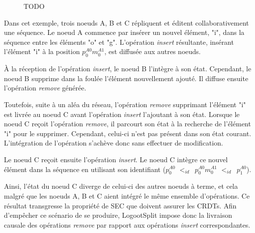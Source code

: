\documentclass[12pt]{thesul}
\newcommand{\trm}[1]{\mathit{#1}}
\newcommand{\id}[3]{$\trm{#1}^{\trm{#2}}_{\trm{#3}}$}
\newcommand{\lid}{$<_{id}$~}
\begin{document}
\begin{figure}[!ht]
{
  }
  \caption{TODO}
  \label{fig:why-causal-remove}
\end{figure}

Dans cet exemple, trois noeuds A, B et C répliquent et éditent collaborativement une séquence.
Le noeud A commence par insérer un nouvel élément, "i", dans la séquence entre les éléments "o" et "g".
L'opération \emph{insert} résultante, insérant l'élément "i" à la position \id{p}{A0}{0}\id{m}{A1}{0}, est diffusée aux autres noeuds.

À la réception de l'opération \emph{insert}, le noeud B l'intègre à son état.
Cependant, le noeud B supprime dans la foulée l'élément nouvellement ajouté.
Il diffuse ensuite l'opération \emph{remove} générée.

Toutefois, suite à un aléa du réseau, l'opération \emph{remove} supprimant l'élément "i" est livrée au noeud C avant l'opération \emph{insert} l'ajoutant à son état.
Lorsque le noeud C reçoit l'opération \emph{remove}, il parcourt son état à la recherche de l'élément "i" pour le supprimer.
Cependant, celui-ci n'est pas présent dans son état courant.
L'intégration de l'opération s'achève donc sans effectuer de modification.

Le noeud C reçoit ensuite l'opération \emph{insert}.
Le noeud C intègre ce nouvel élément dans la séquence en utilisant son identifiant (\id{p}{A0}{0} \lid \id{p}{A0}{0}\id{m}{A1}{0} \lid \id{p}{A0}{1}).

Ainsi, l'état du noeud C diverge de celui-ci des autres noeuds à terme, et cela malgré que les noeuds A, B et C aient intégré le même ensemble d'opérations.
Ce résultat transgresse la propriété de \ac{SEC} que doivent assurer les \acp{CRDT}.
Afin d'empêcher ce scénario de se produire, LogootSplit impose donc la livraison causale des opérations \emph{remove} par rapport aux opérations \emph{insert} correspondantes.
\end{document}
